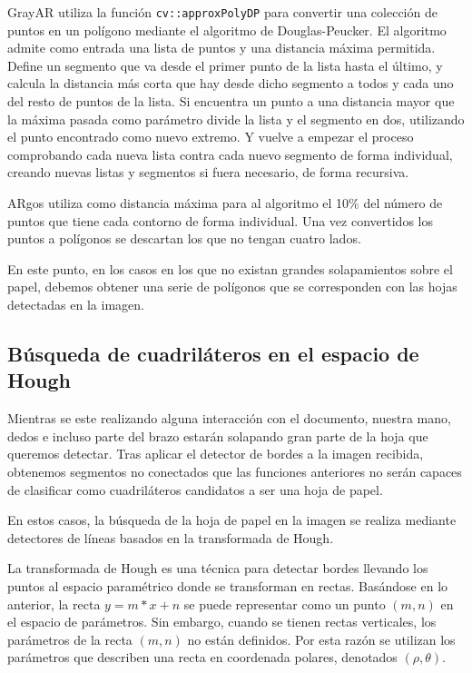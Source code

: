 GrayAR utiliza la función \texttt{cv::approxPolyDP}  para convertir una colección de puntos en un
polígono mediante el algoritmo de Douglas-Peucker. El algoritmo admite como entrada una lista de
puntos y una distancia máxima permitida. Define un segmento que va desde el primer punto de la lista
hasta el último, y calcula la distancia más corta que hay desde dicho segmento a todos y cada uno
del resto de puntos de la lista. Si encuentra un punto a una distancia mayor que la máxima pasada
como parámetro divide la lista y el segmento en dos, utilizando el punto encontrado como nuevo
extremo. Y vuelve a empezar el proceso comprobando cada nueva lista contra cada nuevo segmento de
forma individual, creando nuevas listas y segmentos si fuera necesario, de forma recursiva.

ARgos utiliza como distancia máxima para al algoritmo el 10\% del número de puntos que tiene cada
contorno de forma individual. Una vez convertidos los puntos a polígonos se descartan los que no
tengan cuatro lados.

En este punto, en los casos en los que no existan grandes solapamientos sobre el papel, debemos
obtener una serie de polígonos que se corresponden con las hojas detectadas en la imagen.

\subsection{Búsqueda de cuadriláteros en el espacio de Hough}
Mientras se este realizando alguna interacción con el documento, nuestra mano, dedos e incluso parte
del brazo estarán solapando gran parte de la hoja que queremos detectar. Tras aplicar el detector de
bordes a la imagen recibida, obtenemos segmentos no conectados que las funciones anteriores no serán
capaces de clasificar como cuadriláteros candidatos a ser una hoja de papel.

En estos casos, la búsqueda de la hoja de papel en la imagen se realiza mediante detectores de líneas basados
en la transformada de Hough.

La transformada de Hough es una técnica para detectar bordes llevando los puntos al espacio
paramétrico donde se transforman en rectas.
Basándose en lo anterior, la recta $y = m*x+n$ se puede representar como un punto $(m,n)$ en el
espacio de parámetros. Sin embargo, cuando se tienen rectas
verticales, los parámetros de la recta $(m,n)$  no están definidos. Por esta razón se utilizan los parámetros
que describen una recta en coordenada polares, denotados $(\rho,\theta)$.

